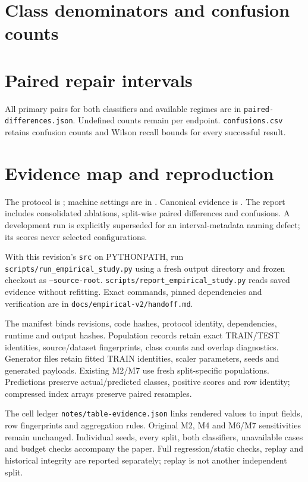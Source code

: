 \section{Class denominators and confusion counts}
\begingroup\small\endgroup
\section{Paired repair intervals}
\begingroup\small\endgroup
All primary pairs for both classifiers and available regimes are in \texttt{paired-differences.json}. Undefined counts remain per endpoint. \texttt{confusions.csv} retains confusion counts and Wilson recall bounds for every successful result.

\section{Evidence map and reproduction}
The protocol is ; machine settings are in . Canonical evidence is . The report includes consolidated ablations, split-wise paired differences and confusions. A development run is explicitly superseded for an interval-metadata naming defect; its scores never selected configurations.

With this revision's \texttt{src} on PYTHONPATH, run \texttt{scripts/run\_empirical\_study.py} using a fresh output directory and frozen checkout as \texttt{--source-root}. \texttt{scripts/report\_empirical\_study.py} reads saved evidence without refitting. Exact commands, pinned dependencies and verification are in \texttt{docs/empirical-v2/handoff.md}.

The manifest binds revisions, code hashes, protocol identity, dependencies, runtime and output hashes. Population records retain exact TRAIN/TEST identities, source/dataset fingerprints, class counts and overlap diagnostics. Generator files retain fitted TRAIN identities, scaler parameters, seeds and generated payloads. Existing M2/M7 use fresh split-specific populations. Predictions preserve actual/predicted classes, positive scores and row identity; compressed index arrays preserve paired resamples.

The cell ledger \texttt{notes/table-evidence.json} links rendered values to input fields, row fingerprints and aggregation rules. Original M2, M4 and M6/M7 sensitivities remain unchanged. Individual seeds, every split, both classifiers, unavailable cases and budget checks accompany the paper. Full regression/static checks, replay and historical integrity are reported separately; replay is not another independent split.
